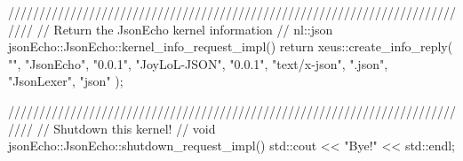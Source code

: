////////////////////////////////////////////////////////////////////////////
// Return the JsonEcho kernel information
//
nl::json jsonEcho::JsonEcho::kernel_info_request_impl() {
  return xeus::create_info_reply(
    "",
    "JsonEcho",
    "0.0.1",
    "JoyLoL-JSON",
    "0.0.1",
    "text/x-json",
    ".json",
    "JsonLexer",
    "json"
  );
}

////////////////////////////////////////////////////////////////////////////
// Shutdown this kernel!
//
void jsonEcho::JsonEcho::shutdown_request_impl() {
  std::cout << "Bye!" << std::endl;
}

\stopCCode

\endtext